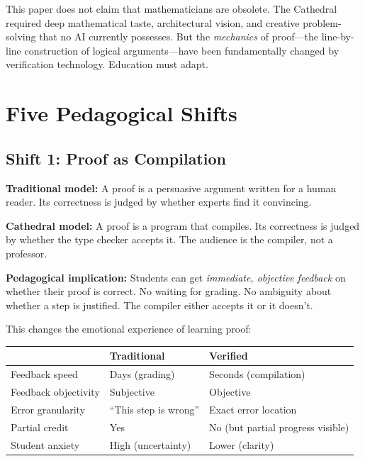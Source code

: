 \documentclass[11pt,a4paper]{article}
\begin{document}
This paper does not claim that mathematicians are obsolete. The
Cathedral required deep mathematical taste, architectural vision,
and creative problem-solving that no AI currently possesses. But
the \emph{mechanics} of proof---the line-by-line construction of
logical arguments---have been fundamentally changed by verification
technology. Education must adapt.

\section{Five Pedagogical Shifts}

\subsection{Shift 1: Proof as Compilation}

\textbf{Traditional model:} A proof is a persuasive argument written
for a human reader. Its correctness is judged by whether experts
find it convincing.

\textbf{Cathedral model:} A proof is a program that compiles. Its
correctness is judged by whether the type checker accepts it. The
audience is the compiler, not a professor.

\textbf{Pedagogical implication:} Students can get \emph{immediate,
objective feedback} on whether their proof is correct. No waiting
for grading. No ambiguity about whether a step is justified. The
compiler either accepts it or it doesn't.

This changes the emotional experience of learning proof:

\begin{center}
\begin{tabular}{@{}lll@{}}
\toprule
& \textbf{Traditional} & \textbf{Verified} \\
\midrule
Feedback speed & Days (grading) & Seconds (compilation) \\
Feedback objectivity & Subjective & Objective \\
Error granularity & ``This step is wrong'' & Exact error location \\
Partial credit & Yes & No (but partial progress visible) \\
Student anxiety & High (uncertainty) & Lower (clarity) \\
\bottomrule
\end{tabular}
\end{center}
\end{document}
